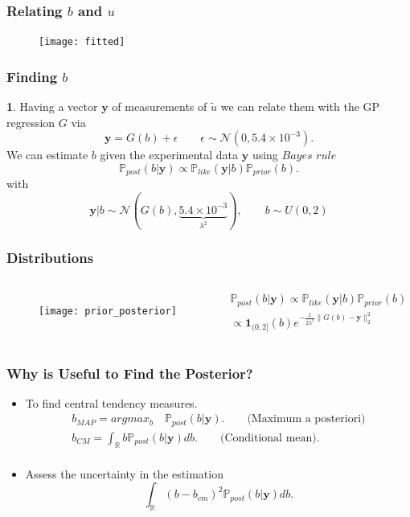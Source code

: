 \documentclass[11pt]{beamer}
\theoremstyle{plain}
\theoremstyle{definition}
\newtheorem{dfn}{}[section]
\newcommand{\y}{\textbf{y}}
\newcommand{\p}{\mathbb{P}}
\newcommand{\like}{\p_{like}}
\newcommand{\prior}{\p_{prior}}
\newcommand{\post}{\p_{post}}
\begin{document}
\begin{frame}
\frametitle{Relating $b$ and $u$}
\begin{figure}
\texttt{[image: fitted]}
\end{figure}
\end{frame}





\begin{frame}
\frametitle{Finding $b$}
\begin{dfn}
Having a vector $\y$ of measurements of $\tilde{u}$  we can relate them with
the GP regression $G$ via
\begin{equation*}
\y=G(b)+\epsilon \qquad \epsilon\sim\mathcal{N}(0,5.4\times 10^{-3}).
\end{equation*}
We can estimate  $b$ given the experimental data $\textbf{y}$
 using $\textit{Bayes rule}$
\begin{equation*}
\post(b|\y)\propto \like(\y|b)\prior(b).
\end{equation*}
with
\begin{equation*}
\y|b\sim \mathcal{N}(G(b),\underbrace{5.4\times 10^{-3}}_{\lambda^{2}}), \qquad b\sim U(0,2)
\end{equation*}
\end{dfn}
\end{frame}

\begin{frame}
\frametitle{Distributions}
\begin{columns}[c]
\column{1.5 in}
\begin{figure}
\texttt{[image: prior\_posterior]}
\end{figure}

\column{1.3in}

\begin{eqnarray*}
\post(b|\y)\propto\like(\y|b)\prior(b)\\
\propto \textbf{1}_{(0,2]}(b)e^{-\frac{1}{2\lambda^{2}}\|G(b)-\textbf{y}\|_{2}^{2}}
\end{eqnarray*}
\end{columns}
\end{frame}

\begin{frame}
\frametitle{Why is Useful to Find the Posterior?}
\begin{itemize}
\item To find central tendency measures.
\begin{eqnarray*}
b_{MAP}=argmax_{b}\quad\post(b|\textbf{y}). 
\qquad\text{(Maximum a posteriori)}\\
b_{CM}=\int_{\mathbb{R}}b\post(b|\textbf{y})db.
\qquad\text{(Conditional mean)}. \\
\end{eqnarray*}
\item Assess the uncertainty in the estimation
\begin{equation*}
\int_{\mathbb{R}}(b-b_{cm})^{2}\post(b|\textbf{y})db.
\end{equation*}
\end{itemize}
\end{frame}
\end{document}

